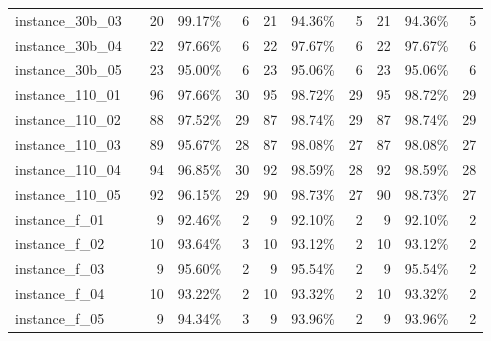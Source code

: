 \documentclass[12pt,a4paper,openright,twoside]{book}
\begin{document}
\begin{table}[H]
{\begin{tabular}{|ll|rrr|rrr|rrr|}
 instance\_30b\_03             &     &     20  &      99.17\%  &   6    &   21  &     94.36\%  &   5        &   21  &     94.36\%  &   5  \\     
 instance\_30b\_04             &     &     22  &      97.66\%  &   6    &   22  &     97.67\%  &   6        &   22  &     97.67\%  &   6  \\     
 instance\_30b\_05             &     &     23  &      95.00\%  &   6    &   23  &     95.06\%  &   6        &   23  &     95.06\%  &   6  \\     
 instance\_110\_01            &     &     96  &     97.66\%  &   30    &   95  &    98.72\%  &   29       &   95  &    98.72\%  &   29  \\     
 instance\_110\_02            &     &     88  &     97.52\%  &   29    &   87  &    98.74\%  &   29       &   87  &    98.74\%  &   29  \\      
 instance\_110\_03            &     &     89  &     95.67\%  &   28    &   87  &    98.08\%  &   27       &   87  &    98.08\%  &   27  \\      
 instance\_110\_04            &     &     94  &     96.85\%  &   30    &   92  &    98.59\%  &   28       &   92  &    98.59\%  &   28  \\     
 instance\_110\_05            &     &     92  &     96.15\%  &   29    &   90  &   98.73\%  &   27        &   90  &   98.73\%  &   27  \\    
 instance\_f\_01              &     &     9  &      92.46\%  &   2     &   9  &      92.10\%  &   2        &   9  &     92.10\%  &   2  \\    
 instance\_f\_02              &     &     10  &     93.64\%  &   3     &   10  &     93.12\%  &   2        &   10  &     93.12\%  &   2  \\    
 instance\_f\_03              &     &     9  &      95.60\%  &   2     &   9  &     95.54\%  &   2        &   9  &     95.54\%  &   2  \\ 
 instance\_f\_04              &     &     10  &     93.22\%  &   2     &   10  &     93.32\%  &   2        &   10  &     93.32\%  &   2  \\    
 instance\_f\_05              &     &     9  &      94.34\%  &   3     &   9  &     93.96\%  &   2        &   9  &     93.96\%  &   2  \\   
  \hline
\end{tabular}
}
\end{table}
\end{document}

